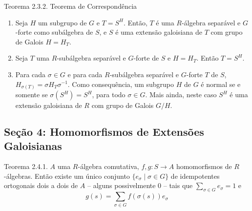 \documentclass{beamer}
\begin{document}
\begin{frame}{Teorema 2.3.2. Teorema de Correspondência}
    \begin{enumerate}
        \item Seja $H$ um subgrupo de $G$ e $T=S^H$. Então, $T$ é uma $R$-álgebra separável e $G$-forte como subálgebra de $S$, e $S$ é uma extensão galoisiana de $T$ com grupo de Galois $H=H_T$.
        \item Seja $T$ uma $R$-subálgebra separável e $G$-forte de $S$ e $H=H_T$. Então $T=S^H$.
        \item Para cada $\sigma \in G$ e para cada $R$-subálgebra separável e $G$-forte $T$ de $S$, $H_{\sigma(T)}=\sigma H_T\sigma^{-1}$. Como consequência, um subgrupo $H$ de $G$ é normal se e somente se $\sigma(S^H) =S^H$, para todo $\sigma \in G$. Mais ainda, neste caso $S^H$ é uma extensão galoisiana de $R$ com grupo de Galois $G/H$.
    \end{enumerate}
\end{frame}


\begin{frame}[fragile]
    \begin{center}
    \end{center}
\end{frame}

            \subsection{Seção 4: Homomorfismos de Extensões Galoisianas}
\begin{frame}{Teorema 2.4.1.}
    $A$ uma $R$-álgebra comutativa, $f,g : S \rightarrow A$ homomorfismos de $R$-álgebras. Então existe um único conjunto $\{e_\sigma \mid \sigma\in G\}$ de idempotentes ortogonais dois a dois de $A$ -- alguns possivelmente 0 -- tais que $\sum_{\sigma \in G} e_\sigma =1$ e \[g(s)=\sum_{\sigma \in G} f(\sigma(s))e_\sigma\]
\end{frame}
\end{document}
